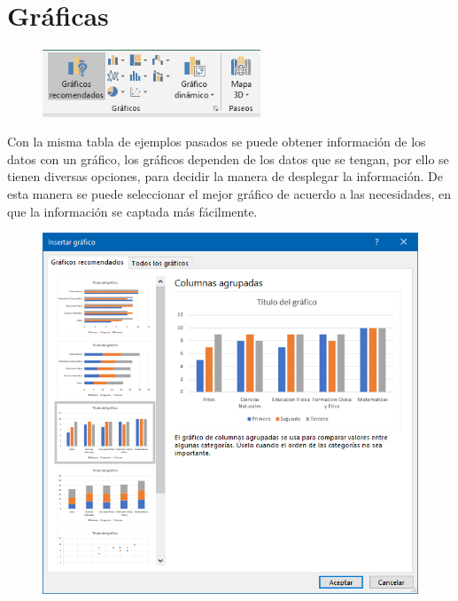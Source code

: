 \documentclass[12pt,a4paper]{book}
\begin{document}
\section{Gráficas}
\begin{figure}
    \centering
    \includegraphics[width=6.5cm]{excel11}
\end{figure}
Con la misma tabla de ejemplos pasados se puede obtener información de los datos con un gráfico, los gráficos dependen de los datos que se tengan, por ello se tienen diversas opciones, para decidir la manera de desplegar la información.
De esta manera se puede seleccionar el mejor gráfico de acuerdo a las necesidades, en que la información se captada más fácilmente.
\begin{figure}[h]
	\centering
    \includegraphics[width=16cm]{excel12}
\end{figure}
\clearpage
\end{document}
